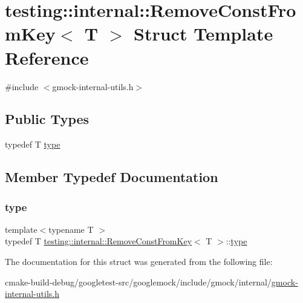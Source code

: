 \hypertarget{structtesting_1_1internal_1_1RemoveConstFromKey}{}\section{testing\+::internal\+::Remove\+Const\+From\+Key$<$ T $>$ Struct Template Reference}
\label{structtesting_1_1internal_1_1RemoveConstFromKey}


{\ttfamily \#include $<$gmock-\/internal-\/utils.\+h$>$}

\subsection*{Public Types}
\begin{DoxyCompactItemize}
\item 
typedef T \mbox{\hyperlink{structtesting_1_1internal_1_1RemoveConstFromKey_ab657b0a0fe4ebc499d27011f73c794c1}{type}}
\end{DoxyCompactItemize}


\subsection{Member Typedef Documentation}
\mbox{\label{structtesting_1_1internal_1_1RemoveConstFromKey_ab657b0a0fe4ebc499d27011f73c794c1}} 
\subsubsection{\texorpdfstring{type}{type}}
{\footnotesize\ttfamily template$<$typename T $>$ \\
typedef T \mbox{\hyperlink{structtesting_1_1internal_1_1RemoveConstFromKey}{testing\+::internal\+::\+Remove\+Const\+From\+Key}}$<$ T $>$\+::\mbox{\hyperlink{structtesting_1_1internal_1_1RemoveConstFromKey_ab657b0a0fe4ebc499d27011f73c794c1}{type}}}



The documentation for this struct was generated from the following file\+:\begin{DoxyCompactItemize}
\item 
cmake-\/build-\/debug/googletest-\/src/googlemock/include/gmock/internal/\mbox{\hyperlink{gmock-internal-utils_8h}{gmock-\/internal-\/utils.\+h}}\end{DoxyCompactItemize}
